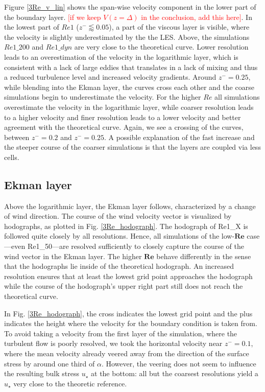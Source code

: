\documentclass[draft,a4paper,11pt]{article}
\newcommand{\todo}[1]{\textcolor{red}{$[$#1$]$}}
\newcommand{\RE}{\mathbf{Re}}
\begin{document}
Figure \ref{3Re_v_lin} shows the span-wise velocity component in the lower part of the boundary layer. \todo{if we keep $V(z=\Delta)$ in the conclusion, add this here}. In the lowest part of $Re1$ ($z^-\lessapprox 0.05$), a part of the viscous layer is visible, where the velocity is slightly underestimated by the the LES. Above, the simulations $Re1\_200$ and $Re1\_dyn$ are very close to the theoretical curve. Lower resolution leads to an overestimation of the velocity in the logarithmic layer, which is consistent with a lack of large eddies that translates in a lack of mixing and thus a reduced turbulence level and increased velocity gradients. Around $z^-=0.25$, while blending into the Ekman layer, the curves cross each other and the coarse simulations begin to underestimate the velocity. For the higher $Re$ all simulations overestimate the velocity in the logarithmic layer, while coarser resolution leads to a higher velocity and finer resolution leads to a lower velocity and better agreement with the theoretical curve. Again, we see a crossing of the curves, between $z^-=0.2$ and $z^-=0.25$. A possible explanation of the fast increase and the steeper course of the coarser simulations is that the layers are coupled via less cells.

\subsection{Ekman layer}

Above the logarithmic layer, the Ekman layer follows, characterized by a change of wind direction. The course of the wind velocity vector is visualized by hodographs, as plotted in Fig. \ref{3Re_hodograph}. The hodograph of Re1\_X is followed quite closely by all resolutions. Hence, all simulations of the low-$\RE$ case---even Re1\_50---are resolved sufficiently to closely capture the course of the wind vector in the Ekman layer. The higher $\RE$ behave differently in the sense that the hodographs lie inside of the theoretical hodograph. An increased resolution ensures that at least the lowest grid point approaches the hodograph while the course of the hodograph's upper right part still does not reach the theoretical curve. 

In Fig. \ref{3Re_hodograph}, the cross indicates the lowest grid point and the plus indicates the height where the velocity for the boundary condition is taken from. To avoid taking a velocity from the first layer of the simulation, where the turbulent flow is poorly resolved, we took the horizontal velocity near $z^-=0.1$, where the mean velocity already veered away from the direction of the surface stress by around one third of $\alpha$. However, the veering does not seem to influence the resulting bulk stress $u_\star$ at the bottom: all but the coarsest resolutions yield a $u_\star$ very close to the theoretic reference.
\end{document}
